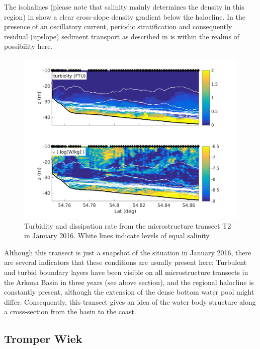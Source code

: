 The isohalines (please note that salinity mainly determines 
the density in this region) in  show a clear cross-slope density 
gradient below the halocline. %
In the presence of an oscillatory current, periodic stratification and 
consequently residual (upslope) sediment transport as described in 
\cite{schulzumlauf2016} is within the realms of possibility here.

\begin{figure}[ht]
\includegraphics[width=40pc]{bilder/abtrans.png}
 \caption{Turbidity and dissipation rate from the microstructure transect T2 
in January 2016. White lines indicate levels of equal salinity.}
 \label{transect}
 \end{figure}
 
 Although this transect is just a snapshot of the situation in January 
2016, there are several indicators that these conditions are usually present 
here: Turbulent and turbid boundary layers have been visible on all 
microstructure transects in the Arkona Basin in three years (see above 
section), 
and the regional halocline is constantly present, although the extension 
of the dense bottom water pool might differ. Consequently, this transect gives 
an idea of the water body structure along a cross-section from the basin to 
the coast.
  
\FloatBarrier
\subsection{Tromper Wiek}

